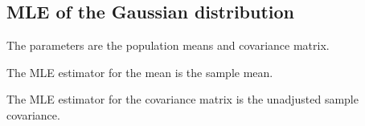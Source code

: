 
\subsection{MLE of the Gaussian distribution}

The parameters are the population means and covariance matrix.

The MLE estimator for the mean is the sample mean.

The MLE estimator for the covariance matrix is the unadjusted sample covariance.


